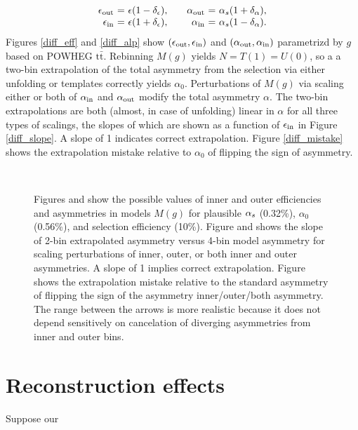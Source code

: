 \documentclass[letterpaper,11pt]{article}
\newcommand{\selected}{{\ensuremath s}}
\newcommand{\tot}{0}
\begin{document}
\[
\begin{array}{r@{\ =\ }l@{,\qquad}r@{\ =\ }l}
  \epsilon_\outr & \epsilon(1 - \depsilon) & \alpha_\outr & \alpha_\selected(1 + \dalpha),\\
  \epsilon_\innr & \epsilon(1+ \depsilon)  & \alpha_\innr & \alpha_\selected(1 - \dalpha).
\end{array}
\]
Figures \ref{diff_eff} and \ref{diff_alp} show
$(\epsilon_{\mathrm{out}},\epsilon_{\mathrm{in}})$ and $(\alpha_{\mathrm{out}},\alpha_{\mathrm{in}})$
parametrizd by $g$ based on POWHEG $\mathrm{t\bar{t}}$. Rebinning
$M(g)$ yields $N=T(1)=U(0)$, so a a two-bin extrapolation of the total
asymmetry from the selection via either unfolding or templates
correctly yields $\alpha_\tot$.  Perturbations of $M(g)$ via scaling
either or both of $\alpha_{\mathrm{in}}$ and $\alpha_{\mathrm{out}}$ modify the total
asymmetry $\alpha$.  The two-bin extrapolations are both (almost, in
case of unfolding) linear in $\alpha$ for all three types of scalings,
the slopes of which are shown as a function of $\epsilon_{\mathrm{in}}$ in
Figure \ref{diff_slope}.  A slope of 1 indicates correct
extrapolation.  Figure \ref{diff_mistake} shows the extrapolation
mistake relative to $\alpha_\tot$ of flipping the sign of asymmetry.
\begin{figure}
  \centering
  \\
  \caption{\label{differential} Figures \protect{} and
    \protect{} show the possible values of inner and
    outer efficiencies and asymmetries in models $M(g)$ for plausible
    $\alpha_\selected$ (0.32\%), $\alpha_\tot$ (0.56\%), and selection
    efficiency (10\%).  Figure \protect{} and shows
    the slope of 2-bin extrapolated asymmetry versus 4-bin model
    asymmetry for scaling perturbations of inner, outer, or both inner
    and outer asymmetries.  A slope of 1 implies correct
    extrapolation.  Figure \protect{} shows the
    extrapolation mistake relative to the standard asymmetry of
    flipping the sign of the asymmetry inner/outer/both asymmetry.
    The range between the arrows is more realistic because it does not
    depend sensitively on cancelation of diverging asymmetries from
    inner and outer bins.}
\end{figure}


\section{Reconstruction effects}

Suppose our 
\end{document}
